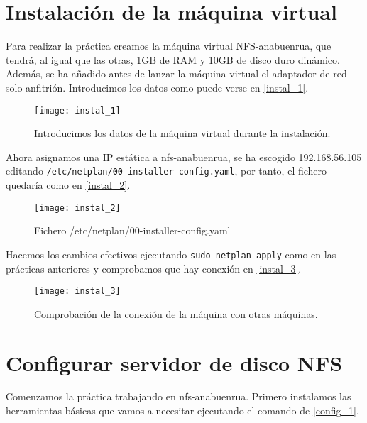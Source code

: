 
\chapter{Instalación de la máquina virtual}

Para realizar la práctica creamos la máquina virtual NFS-anabuenrua, que tendrá, al igual que las otras, 1GB de RAM y 10GB de disco duro dinámico. Además, se ha añadido antes de lanzar la máquina virtual el adaptador de red solo-anfitrión. Introducimos los datos como puede verse en \eqref{instal_1}.

\begin{figure}[h!]
\begin{center}
\caption{Introducimos los datos de la máquina virtual durante la instalación.}
\label{instal_1}
\texttt{[image: instal\_1]}
\end{center}
\end{figure}

Ahora asignamos una IP estática a nfs-anabuenrua, se ha escogido 192.168.56.105 editando \verb|/etc/netplan/00-installer-config.yaml|, por tanto, el fichero quedaría como en \eqref{instal_2}.

\begin{figure}[h!]
\begin{center}
\caption{Fichero /etc/netplan/00-installer-config.yaml}
\label{instal_2}
\texttt{[image: instal\_2]}
\end{center}
\end{figure}

Hacemos los cambios efectivos ejecutando \verb|sudo netplan apply| como en las prácticas anteriores y comprobamos que hay conexión en \eqref{instal_3}.

\begin{figure}[h!]
\begin{center}
\caption{Comprobación de la conexión de la máquina con otras máquinas.}
\label{instal_3}
\texttt{[image: instal\_3]}
\end{center}
\end{figure}

\chapter{Configurar servidor de disco NFS}

Comenzamos la práctica trabajando en nfs-anabuenrua. Primero instalamos las herramientas básicas que vamos a necesitar ejecutando el comando de \eqref{config_1}.


